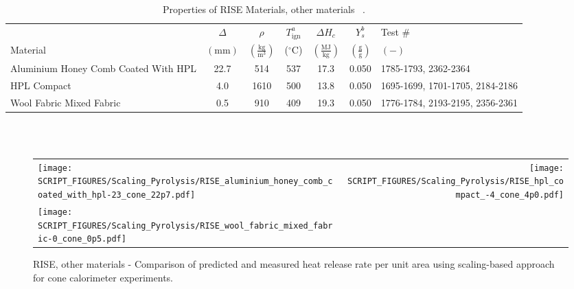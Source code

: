 \clearpage


\begin{table}[!h]
\caption[Properties of RISE Materials, other materials]{Properties of RISE Materials, other materials ~\cite{RISE:Fire_Database}.}
\centering
\begin{tabular}{|p{4.5cm}|c|c|c|c|c|p{3.5cm}|}
\hline
            & \centering$\Delta$& \centering$\rho$& \centering$T_{\mathrm{ign}}^{a}$&\centering$\Delta H_{c}$&\centering$Y_{s}^{b}$ & Test \# \\
Material    & \centering$\mathrm{\left(mm\right)}$ & \centering$\mathrm{\left(\frac{kg}{m^{3}}\right)}$ &  \centering($\mathrm{^{\circ}C}$)   & \centering$\left(\mathrm{\frac{MJ}{kg}}\right)$ & \centering$\mathrm{\left(\frac{g}{g}\right)}$ & $\mathrm{( - )}$  \\ \hline
\hline
Aluminium Honey Comb Coated With HPL              & 22.7 & 514 & 537 & 17.3 & 0.050 & 1785-1793, 2362-2364 \\\hline
HPL Compact                                       & 4.0 & 1610 & 500 & 13.8 & 0.050 & 1695-1699, 1701-1705, 2184-2186 \\\hline
Wool Fabric Mixed Fabric                          & 0.5 & 910 & 409 & 19.3 & 0.050 & 1776-1784, 2193-2195, 2356-2361 \\\hline
\end{tabular}
\label{Properties_RISE_Materials_Others}
\end{table}
\vspace{-0.4cm}
\\
\\


\begin{figure}[p]
\begin{tabular*}{\textwidth}{l@{\extracolsep{\fill}}r}
\texttt{[image: SCRIPT\_FIGURES/Scaling\_Pyrolysis/RISE\_aluminium\_honey\_comb\_coated\_with\_hpl-23\_cone\_22p7.pdf]} &
\texttt{[image: SCRIPT\_FIGURES/Scaling\_Pyrolysis/RISE\_hpl\_compact\_-4\_cone\_4p0.pdf]} \\
\texttt{[image: SCRIPT\_FIGURES/Scaling\_Pyrolysis/RISE\_wool\_fabric\_mixed\_fabric-0\_cone\_0p5.pdf]} &
\end{tabular*}
\caption[HRRPUA of RISE Materials using scaling model, other materials]
{RISE, other materials - Comparison of predicted and measured heat release rate per unit area using scaling-based approach for cone calorimeter experiments.}
\label{RISE_Materials_HRR_Others}
\end{figure}

